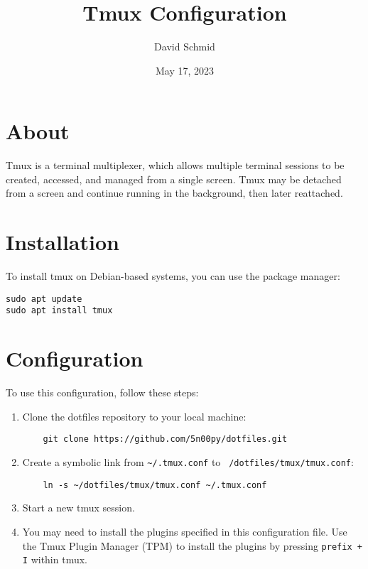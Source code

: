 \documentclass{article}
\title{Tmux Configuration}
\author{David Schmid}
\date{May 17, 2023}
\begin{document}
\maketitle

\section{About}
Tmux is a terminal multiplexer, which allows multiple terminal sessions to be 
created, accessed, and managed from a single screen. Tmux may be detached from 
a screen and continue running in the background, then later reattached.

\section{Installation}
To install tmux on Debian-based systems, you can use the package manager:

\begin{verbatim}
sudo apt update
sudo apt install tmux
\end{verbatim}

\section{Configuration}
To use this configuration, follow these steps:

\begin{enumerate}
  \item Clone the dotfiles repository to your local machine:
    \begin{verbatim}
    git clone https://github.com/5n00py/dotfiles.git    
	\end{verbatim}
  \item Create a symbolic link from \texttt{\textasciitilde/.tmux.conf} to \texttt{~/dotfiles/tmux/tmux.conf}:
    \begin{verbatim}
    ln -s ~/dotfiles/tmux/tmux.conf ~/.tmux.conf
    \end{verbatim}
  \item Start a new tmux session.
  \item You may need to install the plugins specified in this configuration file. 
  Use the Tmux Plugin Manager (TPM) to install the plugins by 
  pressing \texttt{prefix + I} within tmux.
\end{enumerate}
\end{document}
